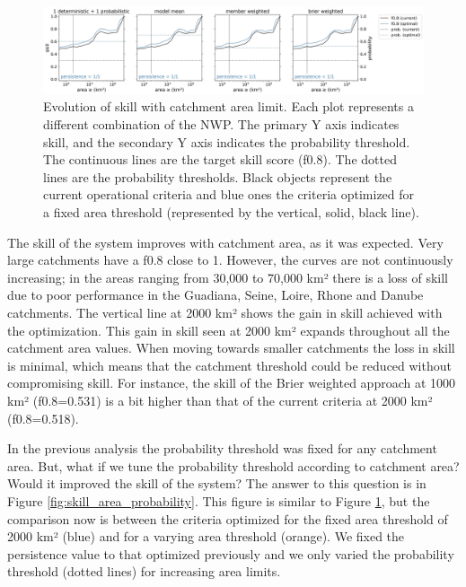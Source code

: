 \documentclass[preprint,12pt]{elsarticle}
\begin{document}
\begin{figure}
    \centering
    \includegraphics[width=1\textwidth]{figures/skill_vs_area_2000km2_1239points_060h.jpg}
    \caption{Evolution of skill with catchment area limit. Each plot represents a different combination of the NWP. The primary Y axis indicates skill, and the secondary Y axis indicates the probability threshold. The continuous lines are the target skill score (f0.8). The dotted lines are the probability thresholds. Black objects represent the current operational criteria and blue ones the criteria optimized for a fixed area threshold (represented by the vertical, solid, black line).}
    \label{fig:skill_area}
\end{figure}

The skill of the system improves with catchment area, as it was expected. Very large catchments have a f0.8 close to 1. However, the curves are not continuously increasing; in the areas ranging from 30,000 to 70,000 km² there is a loss of skill due to poor performance in the Guadiana, Seine, Loire, Rhone and Danube catchments. The vertical line at 2000 km² shows the gain in skill achieved with the optimization. This gain in skill seen at 2000 km² expands throughout all the catchment area values. When moving towards smaller catchments the loss in skill is minimal, which means that the catchment threshold could be reduced without compromising skill. For instance, the skill of the Brier weighted approach at 1000 km² (f0.8=0.531) is a bit higher than that of the current criteria at 2000 km² (f0.8=0.518).

In the previous analysis the probability threshold was fixed for any catchment area. But, what if we tune the probability threshold according to catchment area? Would it improved the skill of the system? The answer to this question is in Figure \ref{fig:skill_area_probability}. This figure is similar to Figure \ref{fig:skill_area}, but the comparison now is between the criteria optimized for the fixed area threshold of 2000 km² (blue) and for a varying area threshold (orange). We fixed the persistence value to that optimized previously and we only varied the probability threshold (dotted lines) for increasing area limits.
\end{document}
